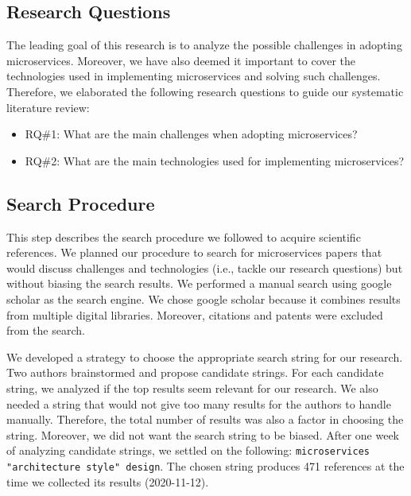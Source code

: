 \subsection{Research Questions}

The leading goal of this research is to analyze the possible challenges in adopting microservices. Moreover, we have also deemed it important to cover the technologies used in implementing microservices and solving such challenges. Therefore, we elaborated the following research questions to guide our systematic literature review:

\begin{itemize}
  \item RQ\#1: What are the main challenges when adopting microservices?
  \item RQ\#2: What are the main technologies used for implementing microservices?
\end{itemize}


\subsection{Search Procedure}

This step describes the search procedure we followed to acquire scientific references. 
We planned our procedure to search for microservices papers that would discuss challenges and technologies (i.e., tackle our research questions) but without biasing the search results. 
We performed a manual search using google scholar as the search engine. 
We chose google scholar because it combines results from multiple digital libraries. 
Moreover, citations and patents were excluded from the search.

We developed a strategy to choose the appropriate search string for our research. Two authors brainstormed and propose candidate strings. For each candidate string, we analyzed if the top results seem relevant for our research. We also needed a string that would not give too many results for the authors to handle manually. Therefore, the total number of results was also a factor in choosing the string. Moreover, we did not want the search string to be biased. After one week of analyzing candidate strings, we settled on the following: \texttt{microservices "architecture style" design}. The chosen string produces 471 references at the time we collected its results (2020-11-12). 



